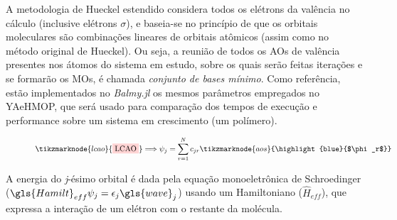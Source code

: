 A metodologia de Hueckel estendido considera todos os elétrons da valência no cálculo (inclusive elétrons $\sigma$), e baseia-se no princípio de que os orbitais moleculares são combinações lineares de orbitais atômicos (assim como no método original de Hueckel). Ou seja, a reunião de todos os \gls{AOs} de valência presentes nos átomos do sistema em estudo, sobre os quais serão feitas iterações e se formarão os \gls{MOs}, é chamada \textit{conjunto de bases mínimo}. Como referência, estão implementados no \textit{Balmy.jl} os mesmos parâmetros empregados no \gls{YAeHMOP}\autocite{Avery2017}, que será usado para comparação dos tempos de execução e performance sobre um sistema em crescimento (um polímero). 

\begin{figure}[htb]
    \vspace{2\baselineskip}
\begin{equation}
    \label{eq:LCAO}
    \tikzmarknode{lcao}{\highlight{red}{LCAO}} \Longrightarrow \psi_j = \sum_{r=1}^{N} c_{jr} \tikzmarknode{aos}{\highlight{blue}{$\phi_r$}}
\end{equation}
\vspace{2\baselineskip}
\end{figure}

A energia do \textit{j}-ésimo orbital é dada pela equação monoeletrônica de Schroedinger ($\gls{Hamilt}_{eff} \psi_j = \epsilon_j \gls{wave}_j$) usando um Hamiltoniano ($\hat{H}_{eff}$), que expressa a interação de um elétron com o restante da molécula.

